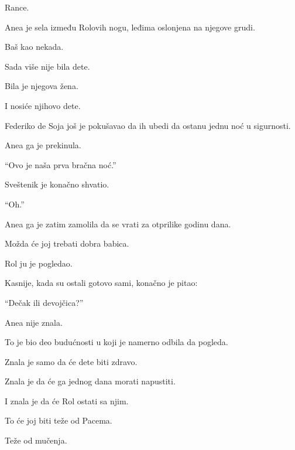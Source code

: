 Rance.

\bigskip

Anea je sela između Rolovih nogu, leđima oslonjena na njegove grudi.

\bigskip

Baš kao nekada.

\bigskip

Sada više nije bila dete.

\bigskip

Bila je njegova žena.

\bigskip

I nosiće njihovo dete.

\bigskip

Federiko de Soja još je pokušavao da ih ubedi da ostanu jednu noć u sigurnosti.

\bigskip

Anea ga je prekinula.

``Ovo je naša prva bračna noć.''

\bigskip

Sveštenik je konačno shvatio.

``Oh.''

\bigskip

Anea ga je zatim zamolila da se vrati za otprilike godinu dana.

\bigskip

Možda će joj trebati dobra babica.

\bigskip

Rol ju je pogledao.

\bigskip

Kasnije, kada su ostali gotovo sami, konačno je pitao:

``Dečak ili devojčica?''

\bigskip

Anea nije znala.

\bigskip

To je bio deo budućnosti u koji je namerno odbila da pogleda.

\bigskip

Znala je samo da će dete biti zdravo.

\bigskip

Znala je da će ga jednog dana morati napustiti.

\bigskip

I znala je da će Rol ostati sa njim.

\bigskip

To će joj biti teže od Pacema.

Teže od mučenja.

